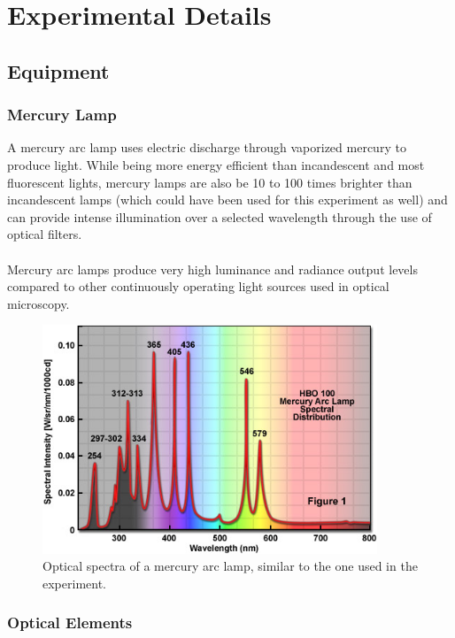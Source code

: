 \section{Experimental Details}

	\subsection{Equipment}
		
		\subsubsection{Mercury Lamp}
			A mercury arc lamp uses electric discharge through vaporized mercury to produce light. While being more energy efficient than incandescent and most fluorescent lights, mercury lamps are also be 10 to 100 times brighter than incandescent lamps (which could have been used for this experiment as well) and can provide intense illumination over a selected wavelength through the use of optical filters.
			\\
			\\
			Mercury arc lamps produce very high luminance and radiance output levels compared to other continuously operating light sources used in optical microscopy.
			\begin{figure}[H]
				\centering
				\includegraphics[width=10cm]{images/mercurylamp.jpg}
				\caption{Optical spectra of a mercury arc lamp, similar to the one used in the experiment.}
				\label{fig:mercuryspectra}
			\end{figure}
		
		\subsubsection{Optical Elements}

